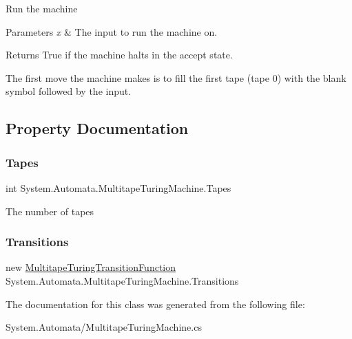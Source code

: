 Run the machine 


\begin{DoxyParams}{Parameters}
{\em x} & The input to run the machine on.\\
\hline
\end{DoxyParams}
\begin{DoxyReturn}{Returns}
True if the machine halts in the accept state.
\end{DoxyReturn}


The first move the machine makes is to fill the first tape (tape 0) with the blank symbol followed by the input.

\subsection{Property Documentation}
\mbox{\label{class_system_1_1_automata_1_1_multitape_turing_machine_a1e2e004b209a91f6d21c09b8fc8481f0}} 
\subsubsection{\texorpdfstring{Tapes}{Tapes}}
{\footnotesize\ttfamily int System.\+Automata.\+Multitape\+Turing\+Machine.\+Tapes\hspace{0.3cm}{\ttfamily [get]}}



The number of tapes 

\mbox{\label{class_system_1_1_automata_1_1_multitape_turing_machine_a89737fb1fa1112b845f1c74fb2b280cd}} 
\subsubsection{\texorpdfstring{Transitions}{Transitions}}
{\footnotesize\ttfamily new \mbox{\hyperlink{class_system_1_1_automata_1_1_multitape_turing_transition_function}{Multitape\+Turing\+Transition\+Function}} System.\+Automata.\+Multitape\+Turing\+Machine.\+Transitions\hspace{0.3cm}{\ttfamily [get]}}







The documentation for this class was generated from the following file\+:\begin{DoxyCompactItemize}
\item 
System.\+Automata/Multitape\+Turing\+Machine.\+cs\end{DoxyCompactItemize}

